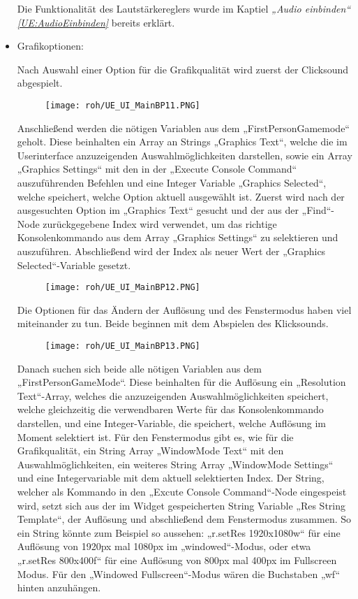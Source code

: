 \begin{itemize}
    Die Funktionalität des Lautstärkereglers wurde im Kaptiel \textit{„Audio einbinden“ \ref{UE:AudioEinbinden}} bereits erklärt.
    \item Grafikoptionen:

    Nach Auswahl einer Option für die Grafikqualität wird zuerst der Clicksound abgespielt.
    \begin{figure}[H]
        \centering
        \texttt{[image: roh/UE\_UI\_MainBP11.PNG]}
        \label{UE:UI_MainBP11}
    \end{figure}
    Anschließend werden die nötigen Variablen aus dem „FirstPersonGamemode“ geholt. Diese beinhalten ein Array an Strings „Graphics Text“, welche die im Userinterface anzuzeigenden Auswahlmöglichkeiten darstellen, sowie ein Array „Graphics Settings“ mit den in der „Execute Console Command“ auszuführenden Befehlen und eine Integer Variable „Graphics Selected“, welche speichert, welche Option aktuell ausgewählt ist.
    Zuerst wird nach der ausgesuchten Option im „Graphics Text“ gesucht und der aus der „Find“-Node zurückgegebene Index wird verwendet, um das richtige Konsolenkommando aus dem Array „Graphics Settings“ zu selektieren und auszuführen. Abschließend wird der Index als neuer Wert der „Graphics Selected“-Variable gesetzt.
    \begin{figure}[H]
        \centering
        \texttt{[image: roh/UE\_UI\_MainBP12.PNG]}
        \label{UE:UI_MainBP12}
    \end{figure}
    Die Optionen für das Ändern der Auflösung und des Fenstermodus haben viel miteinander zu tun. Beide beginnen mit dem Abspielen des Klicksounds.
    \begin{figure}[H]
        \centering
        \texttt{[image: roh/UE\_UI\_MainBP13.PNG]}
        \label{UE:UI_MainBP13}
    \end{figure}
    Danach suchen sich beide alle nötigen Variablen aus dem „FirstPersonGameMode“. Diese beinhalten für die Auflösung ein „Resolution Text“-Array, welches die anzuzeigenden Auswahlmöglichkeiten speichert, welche gleichzeitig die verwendbaren Werte für das Konsolenkommando darstellen, und eine Integer-Variable, die speichert, welche Auflösung im Moment selektiert ist. Für den Fenstermodus gibt es, wie für die Grafikqualität, ein String Array „WindowMode Text“ mit den Auswahlmöglichkeiten, ein weiteres String Array „WindowMode Settings“ und eine Integervariable mit dem aktuell selektierten Index.
    Der String, welcher als Kommando in den „Excute Console Command“-Node eingespeist wird, setzt sich aus der im Widget gespeicherten String Variable „Res String Template“, der Auflösung und abschließend dem Fenstermodus zusammen. So ein String könnte zum Beispiel so aussehen: „r.setRes 1920x1080w“ für eine Auflösung von 1920px mal 1080px im „windowed“-Modus, oder etwa „r.setRes 800x400f“ für eine Auflösung von 800px mal 400px im Fullscreen Modus. Für den „Windowed Fullscreen“-Modus wären die Buchstaben „wf“ hinten anzuhängen.

\end{itemize}
